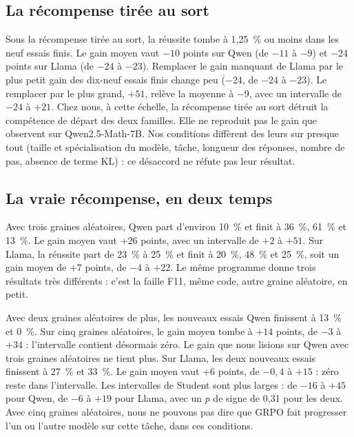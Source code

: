 
\subsection{La récompense tirée au sort}

Sous la récompense tirée au sort, la réussite tombe à 1,25~\% ou moins dans les neuf essais finis. Le gain moyen vaut
$-10$ points sur Qwen (de $-11$ à $-9$) et $-24$ points sur Llama (de $-24$ à $-23$). Remplacer le
gain manquant de Llama par le plus petit gain des dix-neuf essais finis change peu ($-24$, de $-24$ à
$-23$). Le remplacer par le plus grand, $+51$, relève la moyenne à $-9$, avec un intervalle de $-24$ à
$+21$. Chez nous, à cette échelle, la récompense tirée au sort détruit la compétence de départ des
deux familles. Elle ne reproduit pas le gain que \textcite{shao2025spurious} observent sur
Qwen2.5-Math-7B. Nos conditions diffèrent des leurs sur presque tout (taille et spécialisation du
modèle, tâche, longueur des réponses, nombre de pas, absence de terme KL) : ce désaccord ne réfute
pas leur résultat.

\subsection{La vraie récompense, en deux temps}

Avec trois graines aléatoires, Qwen part d'environ 10~\% et finit à 36~\%, 61~\% et 13~\%. Le gain
moyen vaut $+26$ points, avec un intervalle de $+2$ à $+51$. Sur Llama, la réussite part de 23~\% à
25~\% et finit à 20~\%, 48~\% et 25~\%, soit un gain moyen de $+7$ points, de $-4$ à $+22$. Le même
programme donne trois résultats très différents : c'est la faille F11, même code, autre graine
aléatoire, en petit.

Avec deux graines aléatoires de plus, les nouveaux essais Qwen finissent à 13~\% et 0~\%. Sur cinq
graines aléatoires, le gain moyen tombe à $+14$ points, de $-3$ à $+34$ : l'intervalle contient
désormais zéro. Le gain que nous lisions sur Qwen avec trois graines aléatoires ne tient plus. Sur Llama, les
deux nouveaux essais finissent à 27~\% et 33~\%. Le gain moyen vaut $+6$ points, de $-0{,}4$ à $+15$ :
zéro reste dans l'intervalle. Les intervalles de Student sont plus larges : de $-16$ à $+45$
pour Qwen, de $-6$ à $+19$ pour Llama, avec un $p$ de signe de 0,31 pour les deux. Avec cinq graines
aléatoires, nous ne pouvons pas dire que GRPO fait progresser l'un ou l'autre modèle sur cette tâche, dans
ces conditions.

